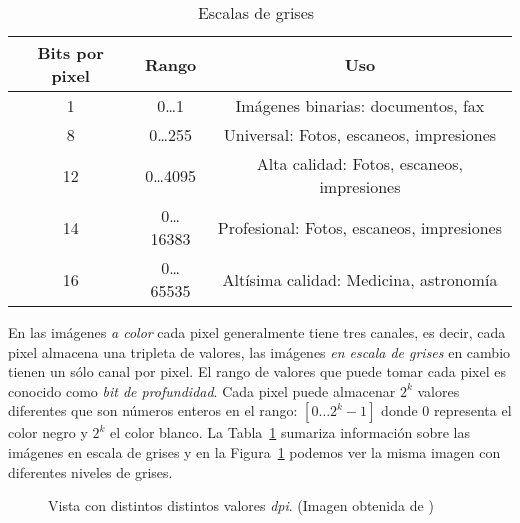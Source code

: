 \begin{table}
  \caption[Escala de grises]{Escalas de grises~\cite{burger2008digital}} 
  \label{table:grayscales}
\begin{center}
{\scriptsize
    \begin{tabular}{c|c|c}
    \hline
    {\bf Bits por pixel} & 
    {\bf Rango} & 
    {\bf Uso} \\
    \hline
    1  & 0\dots1     & Imágenes binarias: documentos, fax \\
    8  & 0\dots255   & Universal: Fotos, escaneos, impresiones   \\
    12 & 0\dots4095  & Alta calidad: Fotos, escaneos, impresiones   \\
    14 & 0\dots16383 & Profesional: Fotos, escaneos, impresiones   \\
    16 & 0\dots65535 & Altísima calidad: Medicina, astronomía   \\
    \hline
    \end{tabular}
}
\end{center}
\end{table}

En las imágenes \textit{a color} cada pixel generalmente tiene tres canales, es
decir, cada pixel almacena una tripleta de valores, las imágenes \textit{en
escala de grises} en cambio tienen un sólo canal por pixel. El rango de valores
que puede tomar cada pixel es conocido como \textit{bit de profundidad}. Cada
pixel puede almacenar $2^k$ valores diferentes que son números enteros en el
rango: $[0\dots2^k - 1]$ donde $0$ representa el color negro y $2^k$ el color
blanco. La Tabla~\ref{table:grayscales} sumariza información sobre las imágenes
en escala de grises y en la Figura~\ref{grayscales} podemos ver la misma imagen
con diferentes niveles de grises.

\begin{figure}[h]
    \centering


  \caption[Niveles de grises]{Vista con distintos distintos valores
  \textit{dpi}. (Imagen obtenida de \cite{sipi})}
  
  \label{grayscales}
\end{figure}

